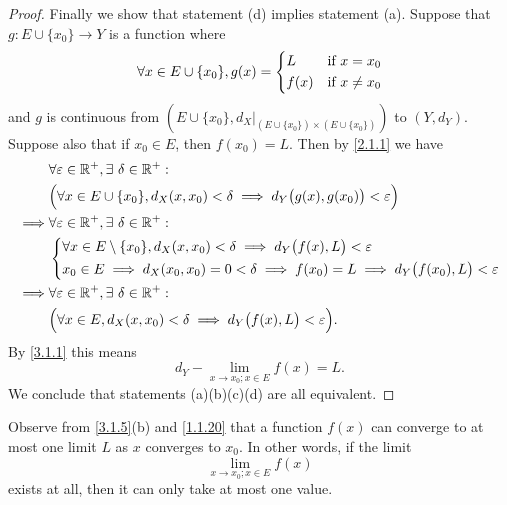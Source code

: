 \begin{proof}
  Finally we show that statement (d) implies statement (a).
  Suppose that \(g : E \cup \{x_0\} \to Y\) is a function where
  \[
    \forall x \in E \cup \{x_0\}, g(x) = \begin{dcases}
      L    & \text{if } x = x_0    \\
      f(x) & \text{if } x \neq x_0
    \end{dcases}
  \]
  and \(g\) is continuous from \((E \cup \{x_0\}, d_X|_{(E \cup \{x_0\}) \times (E \cup \{x_0\})})\) to \((Y, d_Y)\).
  Suppose also that if \(x_0 \in E\), then \(f(x_0) = L\).
  Then by \cref{2.1.1} we have
  \begin{align*}
             & \forall \varepsilon \in \mathbb{R}^+, \exists\ \delta \in \mathbb{R}^+ :                                                       \\
             & \Big(\forall x \in E \cup \{x_0\}, d_X(x, x_0) < \delta \implies d_Y\big(g(x), g(x_0)\big) < \varepsilon\Big)  \\
    \implies & \forall \varepsilon \in \mathbb{R}^+, \exists\ \delta \in \mathbb{R}^+ :                                                       \\
             & \begin{dcases}
                 \forall x \in E \setminus \{x_0\}, d_X(x, x_0) < \delta \implies d_Y\big(f(x), L\big) < \varepsilon \\
                 x_0 \in E \implies d_X(x_0, x_0) = 0 < \delta \implies f(x_0) = L \implies d_Y\big(f(x_0), L\big) < \varepsilon
               \end{dcases} \\
    \implies & \forall \varepsilon \in \mathbb{R}^+, \exists\ \delta \in \mathbb{R}^+ :                                                       \\
             & \Big(\forall x \in E, d_X(x, x_0) < \delta \implies d_Y\big(f(x), L\big) < \varepsilon\Big).
  \end{align*}
  By \cref{3.1.1} this means
  \[
    d_Y - \lim_{x \to x_0 ; x \in E} f(x) = L.
  \]
  We conclude that statements (a)(b)(c)(d) are all equivalent.
\end{proof}

\begin{rmk}\label{3.1.6}
  Observe from \cref{3.1.5}(b) and \cref{1.1.20} that a function \(f(x)\) can converge to at most one limit \(L\) as \(x\) converges to \(x_0\).
  In other words, if the limit
  \[
    \lim_{x \to x_0 ; x \in E} f(x)
  \]
  exists at all, then it can only take at most one value.
\end{rmk}

